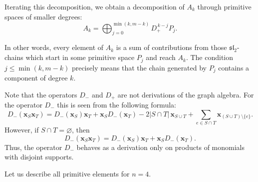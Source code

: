 \documentclass[12pt,reqno]{amsart}
\begin{document}
Iterating this decomposition, we obtain a decomposition of $A_k$ through
primitive spaces of smaller degrees:
\begin{equation} \label{P_to_A}
A_k
=
\bigoplus_{j=0}^{\min(k,m-k)}
D_+^{\,k-j}P_j.
\end{equation}

In other words, every element of $A_k$ is a sum of contributions from those
$\mathfrak{sl}_2$-chains which start in some primitive space $P_j$ and reach
$A_k$. The condition
$j\le \min(k,m-k)$ precisely means that the chain generated by $P_j$ contains
a component of degree $k$.

\medskip

Note that the operators $D_-$ and $D_+$ are not derivations of the graph
algebra. For the operator $D_-$ this is seen from the following formula:
$$
D_-(\boldsymbol{x}_S\boldsymbol{x}_T)
=
D_-(\boldsymbol{x}_S)\boldsymbol{x}_T
+
\boldsymbol{x}_S D_-(\boldsymbol{x}_T)
-
2|S\cap T|\,\boldsymbol{x}_{S\cup T}
+
\sum_{e\in S\cap T}
\boldsymbol{x}_{(S\cup T)\setminus\{e\}}.
$$
However, if $S\cap T=\varnothing$, then
\begin{equation}\label{Leibniz}
D_-(\boldsymbol{x}_S\boldsymbol{x}_T)=D_-(\boldsymbol{x}_S)\boldsymbol{x}_T+\boldsymbol{x}_SD_-(\boldsymbol{x}_T).
\end{equation}
Thus, the operator $D_-$ behaves as a derivation only on products of monomials
with disjoint supports.


\medskip

Let us describe all primitive elements for $n=4$.
\end{document}
